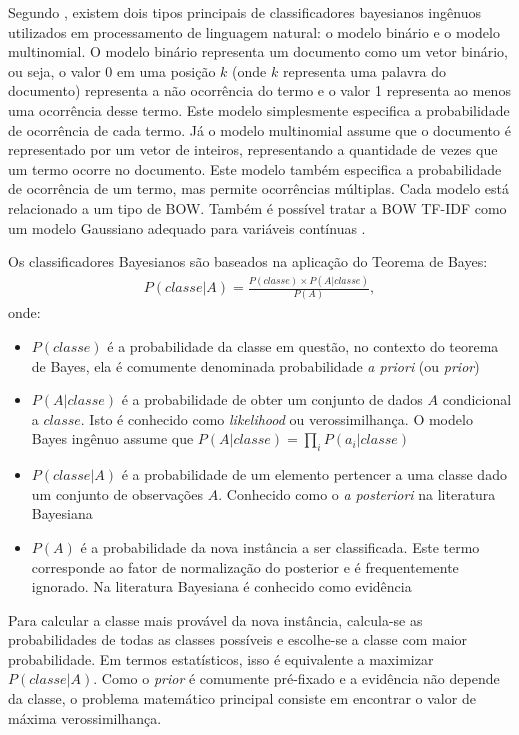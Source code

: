Segundo , existem dois tipos principais de classificadores bayesianos ingênuos utilizados em processamento de linguagem natural: o modelo binário e o modelo multinomial. O modelo binário representa um documento como um vetor binário, ou seja, o valor 0 em uma posição \(k\) (onde \(k\) representa uma palavra do documento) representa a não ocorrência do termo e o valor 1 representa ao menos uma ocorrência desse termo. Este modelo simplesmente especifica a probabilidade de ocorrência de cada termo. Já o modelo multinomial assume que o documento é representado por um vetor de inteiros, representando a quantidade de vezes que um termo ocorre no documento. Este modelo também especifica a probabilidade de ocorrência de um termo, mas permite ocorrências múltiplas. Cada modelo está relacionado a um tipo de BOW. Também é possível tratar a BOW TF-IDF como um modelo Gaussiano adequado para variáveis contínuas \cite{hand2001}.

Os classificadores Bayesianos são baseados na aplicação do Teorema de Bayes:
%
\begin{align}
P(classe|A) = \frac{P(classe) \times P(A|classe)}{P(A)},
\end{align}
%
onde:

\begin{itemize}
    \item \(P(classe)\) é a probabilidade da classe em questão, no contexto do teorema de Bayes, ela é comumente denominada probabilidade \textit{a priori} (ou \textit{prior})
    \item \(P(A|classe)\) é a probabilidade de obter um conjunto de dados \(A\) condicional a \(classe\). Isto é conhecido como \textit{likelihood} ou verossimilhança. O modelo Bayes ingênuo assume que \(P(A|classe) = \prod_{i} P(a_{i}|classe)\)
    \item \(P(classe|A)\) é a probabilidade de um elemento pertencer a uma classe dado um conjunto de observações \(A\). Conhecido como o \textit{a posteriori} na literatura Bayesiana
    \item \(P(A)\) é a probabilidade da nova instância a ser classificada. Este termo corresponde ao fator de normalização do posterior e é frequentemente ignorado. Na literatura Bayesiana é conhecido como evidência \cite{jaynes2003}
\end{itemize}

Para calcular a classe mais provável da nova instância, calcula-se as probabilidades de todas as classes possíveis e escolhe-se a classe com maior probabilidade. Em termos estatísticos, isso é equivalente a maximizar \(P(classe|A)\). Como o \textit{prior} é comumente pré-fixado e a evidência não depende da classe, o problema matemático principal consiste em encontrar o valor de máxima verossimilhança.

